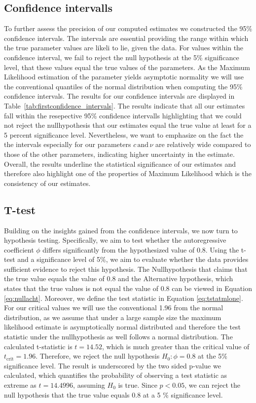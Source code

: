 \documentclass[12pt]{article}
\begin{document}
\subsection{Confidence intervalls}
To further assess the precision of our computed estimates we constructed the 95\% confidence intervals.
The intervals are essential providing the range within which the true parameter values are likeli to lie, given the data.
For values within the confidence interval, we fail to reject the null hypothesis at the 5\% significance level, that these values equal the true values of the parameters.
As the Maximum Likelihood estimation of the parameter yields asymptotic normality we will use the conventional quantiles of the normal distribution when computing the 95\% confidence intervals.
The results for our confidence intervals are displayed in Table~\ref{tab:firstconfidence_intervals}.
The results indicate that all our estimates fall within the resepective 95\% confidence intervalls highlighting that we could not reject the nullhypothesis that our estimates equal the true value at least for a 5 percent significance level.
Nevertheless, we want to emphasize on the fact the the intervals especially for our parameters $c \, \text{and} \, \nu$ are relatively wide compared to those of the other parameters, indicating higher uncertainty in the estimate.
Overall, the results underline the statistical significance of our estimates and therefore also highlight one of the properties of Maximum Likelihood which is the consistency of our estimates.
\subsection{T-test}
Building on the insights gained from the confidence intervals, we now turn to hypothesis testing.
Specifically, we aim to test whether the autoregressive coefficient $\phi$ differs significantly from the hypothesized value of 0.8.
Using the t-test and a significance level of 5\%, we aim to evaluate whether the data provides sufficient evidence to reject this hypothesis.
The Nullhypothesis that claims that the true value equals the value of 0.8 and the Alternative hypothesis, which states that the true values is not equal the value of 0.8 can be viewed in Equation \ref{eq:nullacht}. Moreover, we define the test statistic in Equation \ref{eq:tstatmlone}.
For our critical values we will use the conventional 1.96 from the normal distribution, as we assume that under a large sample size the maximum likelihood estimate is asymptotically normal distributed and therefore the test statistic under the nullhypothesis as well follows a normal distribution.
The calculated t-statistic is \( t = 14.52 \), which is much greater than the critical value of \( t_{\text{crit}} = 1.96 \). Therefore, we  reject the null hypothesis \( H_0: \phi = 0.8 \) at the 5\% significance level.
The result is underscored by the two sided p-value we calculated, which quantifies the probability of observing a test statistic as extreme as \( t = 14.4996 \), assuming \( H_0 \) is true.
Since \( p < 0.05 \), we can reject the null hypothesis that the true value equals 0.8 at a 5 \% significance level. 
\end{document}
